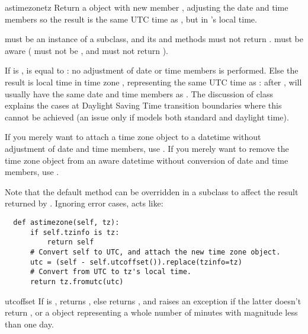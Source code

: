 \begin{methoddesc}{astimezone}{tz}
  Return a  object with new  member
  , adjusting the date and time members so the result is the
  same UTC time as , but in 's local time.

   must be an instance of a  subclass, and its
   and  methods must not return
  .   must be aware ( must
  not be , and  must not return
  ).

  If  is ,
   is equal to :  no
  adjustment of date or time members is performed.
  Else the result is local time in time zone , representing the
  same UTC time as :  after ,
   will usually have the same
  date and time members as .
  The discussion of class  explains the cases at Daylight
  Saving Time transition boundaries where this cannot be achieved (an issue
  only if  models both standard and daylight time).

  If you merely want to attach a time zone object  to a
  datetime  without adjustment of date and time members,
  use .  If
  you merely want to remove the time zone object from an aware datetime
   without conversion of date and time members, use
  .

  Note that the default  method can be overridden
  in a  subclass to affect the result returned by
  .  Ignoring error cases, 
  acts like:

  \begin{verbatim}
  def astimezone(self, tz):
      if self.tzinfo is tz:
          return self
      # Convert self to UTC, and attach the new time zone object.
      utc = (self - self.utcoffset()).replace(tzinfo=tz)
      # Convert from UTC to tz's local time.
      return tz.fromutc(utc)
  \end{verbatim}
\end{methoddesc}

\begin{methoddesc}{utcoffset}{}
  If  is , returns , else
  returns , and
  raises an exception if the latter doesn't return , or
  a  object representing a whole number of minutes
  with magnitude less than one day.
\end{methoddesc}

